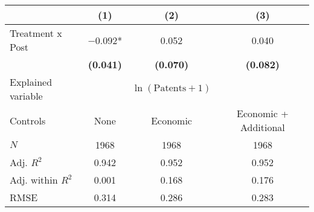 
\begin{tabular}[t]{lccc}
\toprule
  & (1) & (2) & (3)\\
\midrule
Treatment x Post & \num{-0.092}* & \num{0.052} & \num{0.040}\\
\textbf{} & \textbf{(\num{0.041})} & \textbf{(\num{0.070})} & \textbf{(\num{0.082})}\\
\midrule
Explained variable &  & $\ln(\text{Patents}+1)$ & \\
Controls & None & Economic & Economic + Additional\\
$N$ & \num{1968} & \num{1968} & \num{1968}\\
Adj. $R^2$ & \num{0.942} & \num{0.952} & \num{0.952}\\
Adj. within $R^2$ & \num{0.001} & \num{0.168} & \num{0.176}\\
RMSE & \num{0.314} & \num{0.286} & \num{0.283}\\
\bottomrule
\end{tabular}
